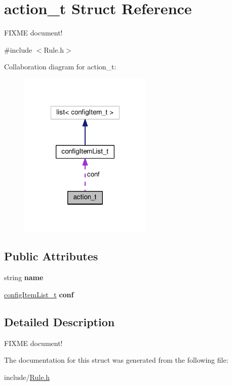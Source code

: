 \hypertarget{structaction__t}{}\section{action\+\_\+t Struct Reference}
\label{structaction__t}


F\+I\+X\+ME document!  




{\ttfamily \#include $<$Rule.\+h$>$}



Collaboration diagram for action\+\_\+t\+:
\nopagebreak
\begin{figure}[H]
\begin{center}
\leavevmode
\includegraphics[width=180pt]{structaction__t__coll__graph}
\end{center}
\end{figure}
\subsection*{Public Attributes}
\begin{DoxyCompactItemize}
\item 
\mbox{\label{structaction__t_af3cabd7053cd8b8b10ca26ac6e606b12}} 
string {\bfseries name}
\item 
\mbox{\label{structaction__t_a615e1166fdee9eb36cbb2f421d6ef9cf}} 
\hyperlink{classconfigItemList__t}{config\+Item\+List\+\_\+t} {\bfseries conf}
\end{DoxyCompactItemize}


\subsection{Detailed Description}
F\+I\+X\+ME document! 

The documentation for this struct was generated from the following file\+:\begin{DoxyCompactItemize}
\item 
include/\hyperlink{Rule_8h}{Rule.\+h}\end{DoxyCompactItemize}
